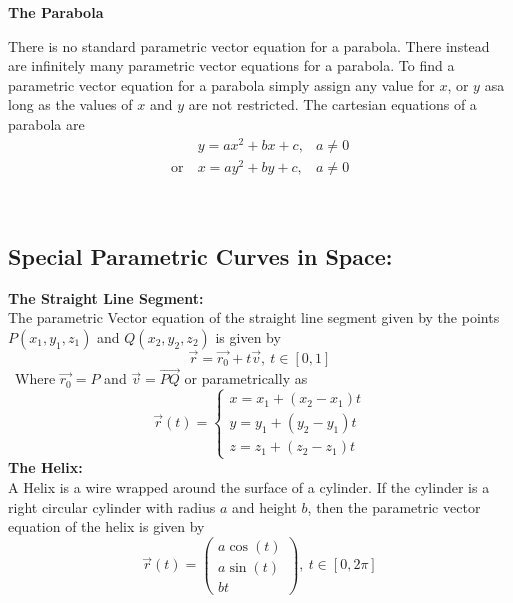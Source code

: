 \documentclass[14pt]{article}
\begin{document}
    \textbf{The Parabola}
    \begin{multicols}{2}
        There is no standard parametric vector equation for a parabola.
        There instead are infinitely many parametric vector equations
        for a parabola. To find a parametric vector equation for a
        parabola simply assign any value for $x$, or $y$ asa long as the
        values of $x$ and $y$ are not restricted. The cartesian
        equations of a parabola are
        \begin{align*}
            &y=ax^2+bx+c,& a\neq 0\\
            \mathrm{or}\ & x=ay^2+by+c,& a\neq 0
        \end{align*}
        \\
    \end{multicols}
    \subsection{Special Parametric Curves in Space:}
    \textbf{The Straight Line Segment:}\\
    The parametric Vector equation of the straight line segment given by
    the points $P(x_1, y_1, z_1)$ and $Q(x_2, y_2, z_2)$ is given by 
    $$\vec r= \vec{r_0}+t\vec v,\ t\in[0,1]$$\ Where $\vec{r_0}=P$ and
    $\vec v=\vec{PQ}$ or parametrically as
    $$\vec r(t)=\left\{\begin{array}{lr} x=x_1+(x_2-x_1)t\\
        y=y_1+(y_2-y_1)t\\
        z=z_1+(z_2-z_1)t \end{array}\right.$$ \textbf{The Helix:}\\
    A Helix is a wire wrapped around the surface of a cylinder. If the
    cylinder is a right circular cylinder with radius $a$ and height
    $b$, then the parametric vector equation of the helix is given by
    $$\vec r(t)=\begin{pmatrix} a\cos(t)\\
        a\sin(t)\\
        bt \end{pmatrix},\ t\in[0,2\pi]$$
\end{document}
